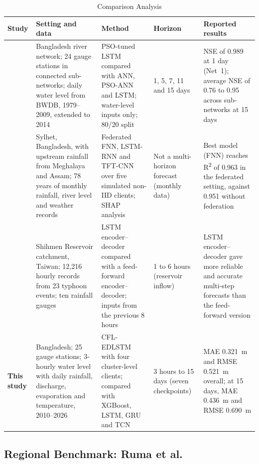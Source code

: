 \begin{table}[htbp]
  \centering
  \caption{Comparison Analysis}
  \label{tab:4.cmp}
  \footnotesize
  \renewcommand{\arraystretch}{1.2}
  \begin{tabularx}{\textwidth}{@{}p{1.9cm} X X p{2.0cm} X@{}}
    \toprule
    \textbf{Study} & \textbf{Setting and data} & \textbf{Method} & \textbf{Horizon} & \textbf{Reported results} \\
    \midrule
    \cite{Ruma2023} &
    Bangladesh river network; 24 gauge stations in connected sub-networks; daily water level from BWDB, 1979--2009, extended to 2014 &
    PSO-tuned LSTM compared with ANN, PSO-ANN and LSTM; water-level inputs only; 80/20 split &
    1, 5, 7, 11 and 15 days &
    NSE of 0.989 at 1 day (Net~1); average NSE of 0.76 to 0.95 across sub-networks at 15 days \\
    \cite{Mahir2025} &
    Sylhet, Bangladesh, with upstream rainfall from Meghalaya and Assam; 78 years of monthly rainfall, river level and weather records &
    Federated FNN, LSTM-RNN and TFT-CNN over five simulated non-IID clients; SHAP analysis &
    Not a multi-horizon forecast (monthly data) &
    Best model (FNN) reaches R\textsuperscript{2} of 0.963 in the federated setting, against 0.951 without federation \\
    \cite{Kao2020} &
    Shihmen Reservoir catchment, Taiwan; 12{,}216 hourly records from 23 typhoon events; ten rainfall gauges &
    LSTM encoder--decoder compared with a feed-forward encoder--decoder; inputs from the previous 8 hours &
    1 to 6 hours (reservoir inflow) &
    LSTM encoder--decoder gave more reliable and accurate multi-step forecasts than the feed-forward version \\
    \midrule
    \rowcolor{gray!15}
    \textbf{This study} &
    Bangladesh; 25 gauge stations; 3-hourly water level with daily rainfall, discharge, evaporation and temperature, 2010--2026 &
    CFL-EDLSTM with four cluster-level clients; compared with XGBoost, LSTM, GRU and TCN &
    3 hours to 15 days (seven checkpoints) &
    MAE 0.321~m and RMSE 0.521~m overall; at 15 days, MAE 0.436~m and RMSE 0.690~m \\
    \bottomrule
  \end{tabularx}
\end{table}

\subsection{Regional Benchmark: Ruma et al.}
\label{sec:4.13.1}

